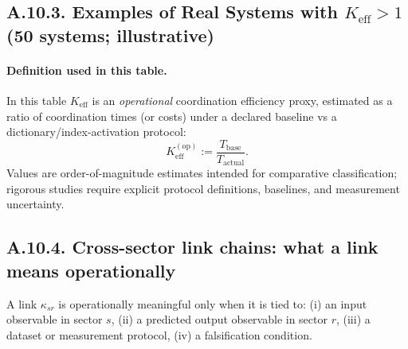 \documentclass[13pt,a4paper]{article}
\newcommand{\Keff}{K_{\mathrm{eff}}}
\begin{document}
	\subsection*{A.10.3. Examples of Real Systems with $\Keff>1$ (50 systems; illustrative)}
	
	
	\paragraph{Definition used in this table.}
	In this table $K_{\mathrm{eff}}$ is an \emph{operational} coordination efficiency proxy, estimated as a ratio of coordination times (or costs) under a declared baseline vs a dictionary/index-activation protocol:
	$$
	K_{\mathrm{eff}}^{(\mathrm{op})} := \frac{T_{\mathrm{base}}}{T_{\mathrm{actual}}}.
	$$
	Values are order-of-magnitude estimates intended for comparative classification; rigorous studies require explicit protocol definitions, baselines, and measurement uncertainty.
	\subsection*{A.10.4. Cross-sector link chains: what a link means operationally}
	
	A link $\kappa_{sr}$ is operationally meaningful only when it is tied to:
	(i) an input observable in sector $s$,
	(ii) a predicted output observable in sector $r$,
	(iii) a dataset or measurement protocol,
	(iv) a falsification condition.
	
\end{document}
